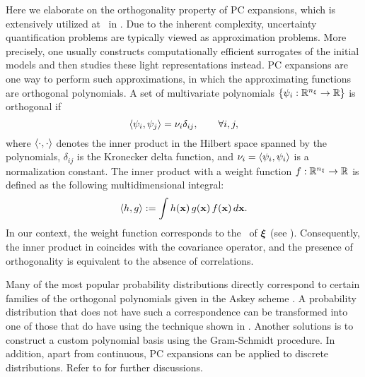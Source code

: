 Here we elaborate on the orthogonality property \cite{xiu2010} of PC expansions, which is extensively utilized at \ in .
Due to the inherent complexity, uncertainty quantification problems are typically viewed as approximation problems.
More precisely, one usually constructs computationally efficient surrogates of the initial models and then studies these light representations instead.
PC expansions \cite{xiu2010} are one way to perform such approximations, in which the approximating functions are orthogonal polynomials.
A set of multivariate polynomials $\{ \psi_i: \mathbb{R}^{n_\xi} \to \mathbb{R} \}$ is orthogonal if
\begin{equation} \elabel{orthogonality}
  \oInner{\pcb_i}{\pcb_j} = \pcn_i \delta_{ij}, \qquad \forall i, j,
\end{equation}
where $\oInner{\cdot}{\cdot}$ denotes the inner product in the Hilbert space spanned by the polynomials, $\delta_{ij}$ is the Kronecker delta function, and $\pcn_i = \oInner{\pcb_i}{\pcb_i}$ is a normalization constant.
The inner product with a weight function $f: \mathbb{R}^{n_\xi} \to \mathbb{R}$ is defined as the following multidimensional integral:
\begin{equation} \elabel{inner-product}
  \oInner{h}{g} := \int h(\vX) \, g(\vX) \, \fPDF(\vX) \, d\vX.
\end{equation}
In our context, the weight function corresponds to the \pdf\ of $\boldsymbol{\xi}$ (see ).
Consequently, the inner product in  coincides with the covariance operator, and the presence of orthogonality is equivalent to the absence of correlations.

Many of the most popular probability distributions directly correspond to certain families of the orthogonal polynomials given in the Askey scheme \cite{xiu2010}.
A probability distribution that does not have such a correspondence can be transformed into one of those that do have using the technique shown in .
Another solutions is to construct a custom polynomial basis using the Gram-Schmidt procedure.
In addition, apart from continuous, PC expansions can be applied to discrete distributions.
Refer to \cite{xiu2010} for further discussions.
